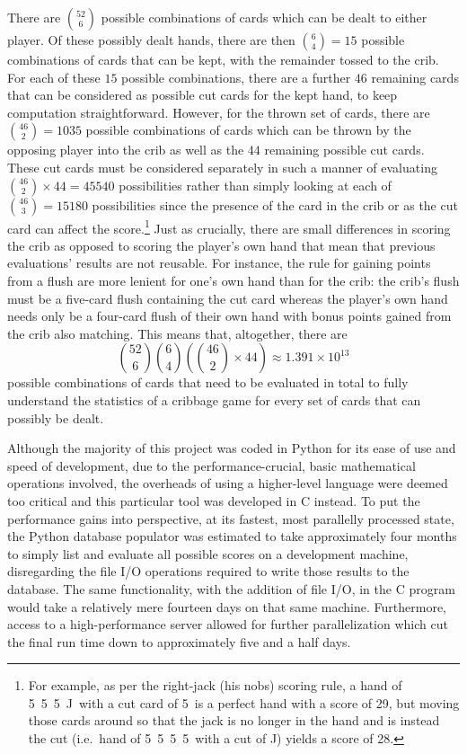There are ${52 \choose 6}$ possible combinations of cards which can be dealt to
either player.
%
Of these possibly dealt hands, there are then ${6 \choose 4} = 15$ possible
combinations of cards that can be kept,
with the remainder tossed to the crib.
%
For each of these $15$ possible combinations,
there are a further $46$ remaining cards
that can be considered as possible cut cards for the kept hand,
to keep computation straightforward.
%
However, for the thrown set of cards,
there are ${46 \choose 2} = 1035$ possible combinations of cards which can be
thrown by the opposing player into the crib as well as the
$44$ remaining possible cut cards.
%
These cut cards must be considered separately in such a manner of
evaluating ${46 \choose 2} \times 44 = 45540$ possibilities rather than
simply looking at each of ${46 \choose 3} = 15180$ possibilities
since the presence of the card in the crib or as the cut card
can affect the score.\footnote{
	For example, as per the right-jack (his nobs) scoring rule,
	a hand of 5\clubs\ 5\hearts\ 5\spades\ J\diamonds\ 
	with a cut card of 5\diamonds\ is a perfect hand
	with a score of 29,
	but moving those cards around so that the jack is no longer in the hand
	and is instead the cut
	(i.e.\  hand of 5\clubs\ 5\hearts\ 5\spades\ 5\diamonds\
	with a cut of J\diamonds)
	yields a score of 28.
}
%
Just as crucially, there are small differences in scoring the crib as opposed to
scoring the player's own hand that mean that previous evaluations' results are
not reusable.
%
For instance, the rule for gaining points from a flush are more lenient for
one's own hand than for the crib:
the crib's flush must be a five-card flush containing the cut card
whereas the player's own hand needs only be a four-card flush of their own
hand with bonus points gained from the crib also matching.
%
This means that, altogether, there are 
\[
	{52 \choose 6}
	{6 \choose 4}
	\left(
			{46 \choose 2} \times 44
	\right)
	\approx
	1.391 \times {10}^{13}
\]
possible combinations of cards that need to be evaluated in total to fully 
understand the statistics
of a cribbage game for every set of cards that can possibly be dealt.

Although the majority of this project was coded in Python for its ease of use
and speed of development,
due to the performance-crucial, basic mathematical operations involved,
the overheads of using a higher-level language were deemed too critical and
this particular tool was developed in C instead.
%
To put the performance gains into perspective,
at its fastest, most parallelly processed state,
the Python database populator was estimated to take approximately four months to
simply list and evaluate all possible scores on a development machine,
disregarding the file I/O operations required to write those results to the
database.
%
The same functionality, with the addition of file I/O,
in the C program would take a relatively mere fourteen days
on that same machine.
%
Furthermore, access to a high-performance server allowed for further
parallelization which cut the final run time down to approximately
five and a half days.


